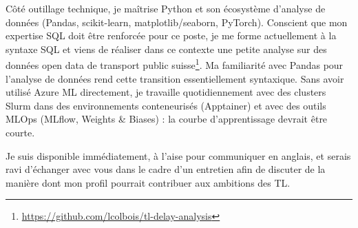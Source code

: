 \documentclass[11pt, a4paper]{awesome-cv}
\begin{document}
\begin{cvletter}
Côté outillage technique, je maîtrise Python et son écosystème d'analyse de données (Pandas, scikit-learn, matplotlib/seaborn, PyTorch). Conscient que mon expertise SQL doit être renforcée pour ce poste, je me forme actuellement à la syntaxe SQL et viens de réaliser dans ce contexte une petite analyse sur des données open data de transport public suisse\footnote{\url{https://github.com/lcolbois/tl-delay-analysis}}. Ma familiarité avec Pandas pour l'analyse de données rend cette transition essentiellement syntaxique. Sans avoir utilisé Azure ML directement, je travaille quotidiennement avec des clusters Slurm dans des environnements conteneurisés (Apptainer) et avec des outils MLOps (MLflow, Weights \& Biases) : la courbe d'apprentissage devrait être courte. 

Je suis disponible immédiatement, à l'aise pour communiquer en anglais, et serais ravi d'échanger avec vous dans le cadre d'un entretien afin de discuter de la manière dont mon profil pourrait contribuer aux ambitions des TL.


\end{cvletter}


\makeletterclosing
\end{document}
